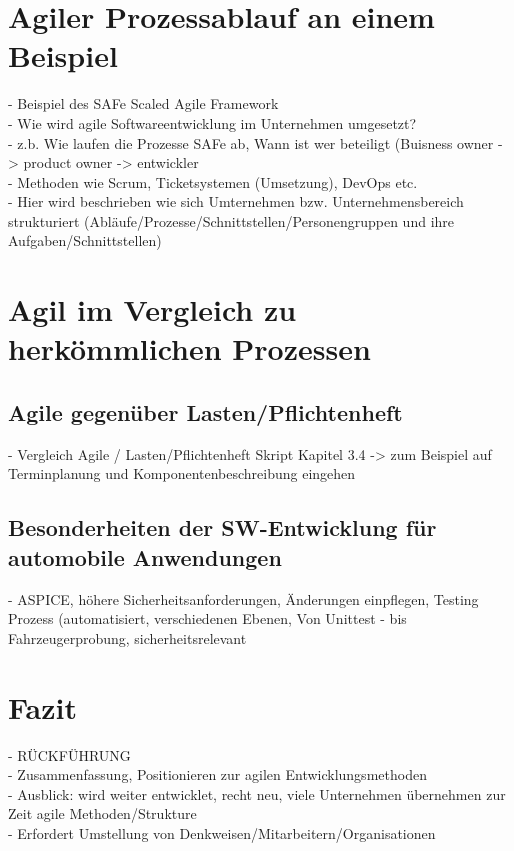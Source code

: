 \section{Agiler Prozessablauf an einem Beispiel}
- Beispiel des SAFe Scaled Agile Framework\\ 
- Wie wird agile Softwareentwicklung im Unternehmen umgesetzt? \\
- z.b. Wie laufen die Prozesse SAFe ab, Wann ist wer beteiligt (Buisness owner -> product owner -> entwickler\\
- Methoden wie Scrum, Ticketsystemen (Umsetzung), DevOps etc. \\ 
- Hier wird beschrieben wie sich Umternehmen bzw. Unternehmensbereich strukturiert (Abläufe/Prozesse/Schnittstellen/Personengruppen und ihre Aufgaben/Schnittstellen) \\ 
 
\section{Agil im Vergleich zu herkömmlichen Prozessen}\label{vergleich}

\subsection{Agile gegenüber Lasten/Pflichtenheft}
- Vergleich Agile / Lasten/Pflichtenheft Skript Kapitel 3.4 -> zum Beispiel auf Terminplanung und Komponentenbeschreibung eingehen\\

\subsection{Besonderheiten der SW-Entwicklung für automobile Anwendungen}
- ASPICE, höhere Sicherheitsanforderungen, Änderungen einpflegen, Testing Prozess (automatisiert, verschiedenen Ebenen, Von Unittest - bis Fahrzeugerprobung, sicherheitsrelevant\\

\section{Fazit}
- RÜCKFÜHRUNG\\
- Zusammenfassung, Positionieren zur agilen Entwicklungsmethoden \\
- Ausblick: wird weiter entwicklet, recht neu, viele Unternehmen übernehmen zur Zeit agile Methoden/Strukture \\
- Erfordert Umstellung von Denkweisen/Mitarbeitern/Organisationen\\
